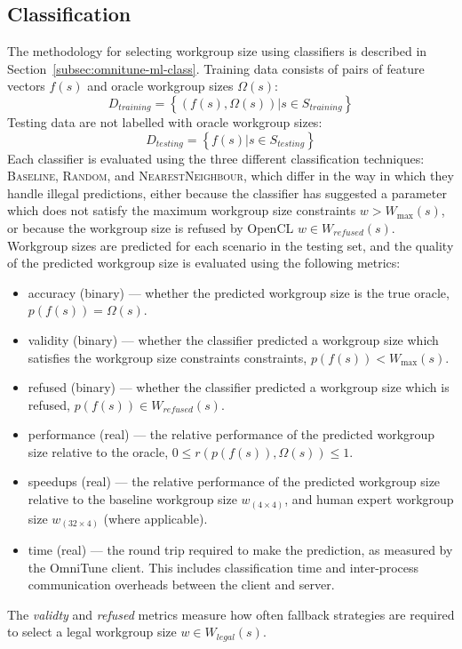 \subsection{Classification}

The methodology for selecting workgroup size using classifiers is
described in Section~\ref{subsec:omnitune-ml-class}. Training data
consists of pairs of feature vectors $f(s)$ and oracle workgroup sizes
$\Omega(s)$:
%
\begin{equation}
  D_{training} = \left\{ (f(s),\Omega(s)) | s \in S_{training} \right\}
\end{equation}
%
Testing data are not labelled with oracle workgroup sizes:
%
\begin{equation}
  D_{testing} = \left\{ f(s) | s \in S_{testing} \right\}
\end{equation}
%
Each classifier is evaluated using the three different classification
techniques: \textsc{Baseline}, \textsc{Random}, and
\textsc{NearestNeighbour}, which differ in the way in which they
handle illegal predictions, either because the classifier has
suggested a parameter which does not satisfy the maximum workgroup
size constraints $w > W_{\max}(s)$, or because the workgroup size is
refused by OpenCL $w \in W_{refused}(s)$. Workgroup sizes are
predicted for each scenario in the testing set, and the quality of the
predicted workgroup size is evaluated using the following metrics:
%
\begin{itemize}
\item accuracy (binary) --- whether the predicted workgroup size is
  the true oracle, $p(f(s)) = \Omega(s)$.
\item validity (binary) --- whether the classifier predicted a
  workgroup size which satisfies the workgroup size constraints
  constraints, $p(f(s)) < W_{\max}(s)$.
\item refused (binary) --- whether the classifier predicted a
  workgroup size which is refused, $p(f(s)) \in W_{refused}(s)$.
\item performance (real) --- the relative performance of the predicted
  workgroup size relative to the oracle,
  $0 \le r(p(f(s)), \Omega(s)) \le 1$.
\item speedups (real) --- the relative performance of the predicted
  workgroup size relative to the baseline workgroup size
  $w_{(4 \times 4)}$, and human expert workgroup size
  $w_{(32 \times 4)}$ (where applicable).
\item time (real) --- the round trip required to make the prediction,
  as measured by the OmniTune client. This includes classification
  time and inter-process communication overheads between the client
  and server.
\end{itemize}
%
The \emph{validty} and \emph{refused} metrics measure how often
fallback strategies are required to select a legal workgroup size
$w \in W_{legal}(s)$.

